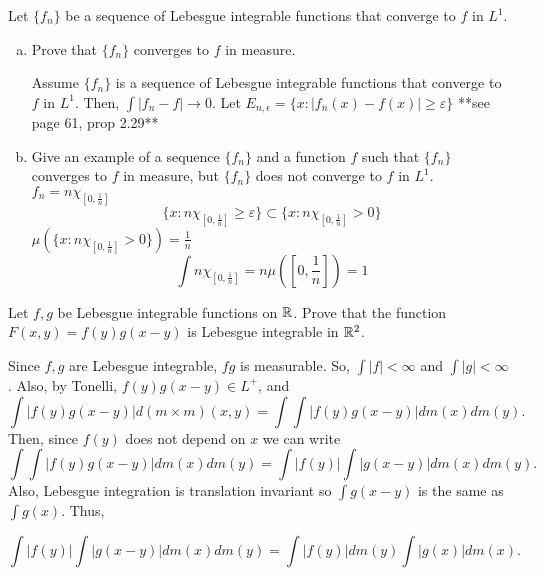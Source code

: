 \begin{list}
\begin{enumerate}[(a)]
\begin{pf}
\end{pf}
\end{enumerate} 


\item Let $\{f_n \}$ be a sequence of Lebesgue integrable functions that converge to $f$ in $L^1$. 

\begin{enumerate}[(a)] %
\item Prove that $\{ f_n \}$ converges to $f$ in measure.
\begin{pf}
Assume $\{f_n \}$ is a sequence of Lebesgue integrable functions that converge to $f$ in $L^1$. Then, $\int |f_n - f| \rightarrow 0$. Let $E_{n, \epsilon}=\{x: |f_n(x)-f(x)|\geq \varepsilon\}$
**see page 61, prop 2.29**
\end{pf}
\item Give an example of a sequence $\{f_n\}$ and a function $f$ such that $\{f_n\}$ converges to $f$ in measure, but $\{f_n\}$ does not converge to $f$ in $L^1$. 
\\
$f_n= n\chi_{[0, \frac{1}{n}]}$\\
\[
\{x: n\chi_{[0, \frac{1}{n}]}\geq \varepsilon \} \subset \{ x: n\chi_{[0, \frac{1}{n}]}>0 \}
\]
$\mu(\{ x: n\chi_{[0, \frac{1}{n}]}>0 \})=\frac{1}{n}$\\
\[
\int n \chi_{[0, \frac{1}{n}]} = n\mu\left(\left[0, \frac{1}{n}\right]\right)=1
\]
\end{enumerate} 


\item Let $f, g$ be Lebesgue integrable functions on ${\mathbb R}$. Prove that the function $F(x,y)=f(y)g(x-y)$ is Lebesgue integrable in ${\mathbb R}^2$.
\begin{pf}
	Since $f,g$ are Lebesgue integrable, $fg$ is measurable. So, $\int|f| < \infty$ and $\int|g| < \infty$. Also, by Tonelli, $f(y)g(x-y) \in L^+$, and\[
	\int |f(y)g(x-y)| d(m \times m)(x,y) = \int \int |f(y) g(x-y)| dm(x) dm(y).
	\]
Then, since $f(y)$ does not depend on $x$ we can write
\[
\int \int |f(y) g(x-y)| dm(x) dm(y)= \int |f(y)| \int |g(x-y)| dm(x) dm(y).
	\]
	Also, Lebesgue integration is translation invariant so $\int g(x-y)$ is the same as $\int g(x)$. Thus,
	
	\[
	\int |f(y)| \int |g(x-y)| dm(x) dm(y) = \int |f(y)| dm(y) \int |g(x)| dm(x) .
	\]

\end{pf}


\end{list}

